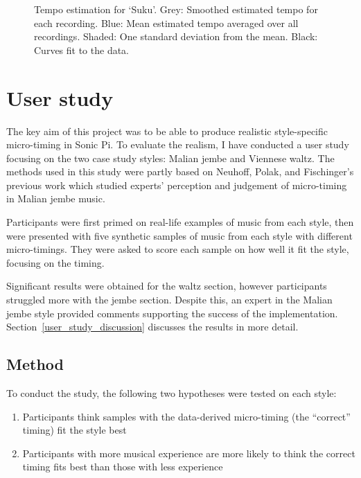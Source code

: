 \documentclass[12pt,twoside,openright]{report}
\begin{document}
\begin{figure}[ht]
    \centering
    
    \caption{Tempo estimation for `Suku'. Grey: Smoothed estimated tempo for each recording. Blue: Mean estimated tempo averaged over all recordings. Shaded: One standard deviation from the mean. Black: Curves fit to the data.}
    \label{fig:suku_tempo}
\end{figure}



\section{User study} \label{user_study}

The key aim of this project was to be able to produce realistic style-specific
micro-timing in Sonic Pi. To evaluate the realism, I have conducted a user study
focusing on the two case study styles: Malian jembe and Viennese waltz. The
methods used in this study were partly based on Neuhoff, Polak, and Fischinger's
previous work \cite{neuhoff2017} which studied experts' perception and judgement of
micro-timing in Malian jembe music.

Participants were first primed on real-life
examples of music from each style, then were presented with five synthetic
samples of music from each style with different micro-timings. They were asked
to score each sample on how well it fit the style, focusing on the timing.

Significant results were obtained for the waltz section, however participants
struggled more with the jembe section. Despite this, an expert in the Malian
jembe style provided comments supporting the success of the implementation. Section~\ref{user_study_discussion} discusses the results in more detail.


\subsection{Method} \label{user_study_method}

To conduct the study, the following two hypotheses were tested on each style:

\begin{enumerate}
    \item \label{hypothesis_1} Participants think samples with the data-derived micro-timing (the ``correct'' timing) fit the style best
    \item \label{hypothesis_2} Participants with more musical experience are more likely to think the correct timing fits best than those with less experience
\end{enumerate}
\end{document}
